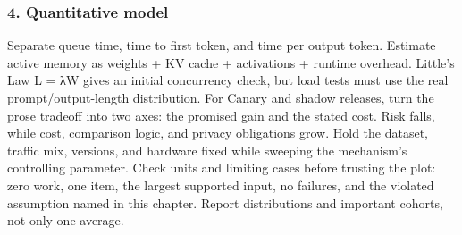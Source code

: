 \subsubsection*{4. Quantitative model}
Separate queue time, time to first token, and time per output token. Estimate active memory as weights + KV cache + activations + runtime overhead. Little's Law L = λW gives an initial concurrency check, but load tests must use the real prompt/output-length distribution.
For Canary and shadow releases, turn the prose tradeoff into two axes: the promised gain and the stated cost. Risk falls, while cost, comparison logic, and privacy obligations grow. Hold the dataset, traffic mix, versions, and hardware fixed while sweeping the mechanism's controlling parameter.
Check units and limiting cases before trusting the plot: zero work, one item, the largest supported input, no failures, and the violated assumption named in this chapter. Report distributions and important cohorts, not only one average.
